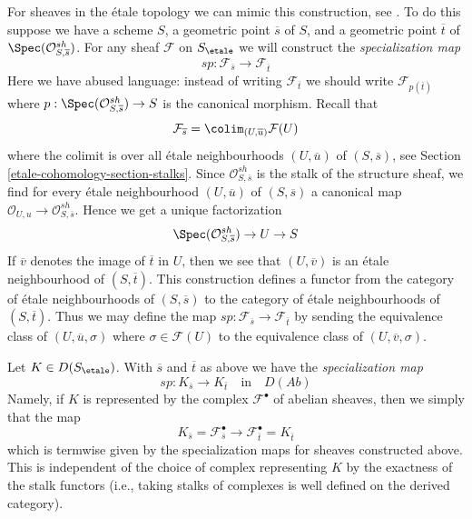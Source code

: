 \medskip\noindent
For sheaves in the \'etale topology we can mimic this construction, see
\cite[Exposee VIII, 7.7, page 397]{SGA4}. To do this suppose we have
a scheme $S$, a geometric point $\overline{s}$ of $S$, and a geometric
point $\overline{t}$ of $\Spec(\mathcal{O}^{sh}_{S, \overline{s}})$.
For any sheaf $\mathcal{F}$ on $S_\etale$ we will construct the
{\it specialization map}
$$
sp : \mathcal{F}_{\overline{s}} \longrightarrow \mathcal{F}_{\overline{t}}
$$
Here we have abused language: instead of writing
$\mathcal{F}_{\overline{t}}$ we should write $\mathcal{F}_{p(\overline{t})}$
where $p : \Spec(\mathcal{O}^{sh}_{S, \overline{s}}) \to S$ is the canonical
morphism. Recall that
$$
\mathcal{F}_{\overline{s}} = \colim_{(U, \overline{u})} \mathcal{F}(U)
$$
where the colimit is over all \'etale neighbourhoods $(U, \overline{u})$
of $(S, \overline{s})$, see Section \ref{etale-cohomology-section-stalks}. Since
$\mathcal{O}^{sh}_{S, \overline{s}}$ is the stalk of the
structure sheaf, we find for every \'etale neighbourhood
$(U, \overline{u})$ of $(S, \overline{s})$ a canonical map
$\mathcal{O}_{U, u} \to \mathcal{O}^{sh}_{S, \overline{s}}$.
Hence we get a unique factorization
$$
\Spec(\mathcal{O}^{sh}_{S, \overline{s}}) \to U \to S
$$
If $\overline{v}$ denotes the image of $\overline{t}$ in $U$, then we see that
$(U, \overline{v})$ is an \'etale neighbourhood of $(S, \overline{t})$.
This construction defines a functor from the category of \'etale neighbourhoods
of $(S, \overline{s})$ to the category of \'etale neighbourhoods of
$(S, \overline{t})$. Thus we may define the map
$sp : \mathcal{F}_{\overline{s}} \to \mathcal{F}_{\overline{t}}$
by sending the equivalence class of
$(U, \overline{u}, \sigma)$ where $\sigma \in \mathcal{F}(U)$
to the equivalence class of $(U, \overline{v}, \sigma)$.

\medskip\noindent
Let $K \in D(S_\etale)$. With $\overline{s}$ and $\overline{t}$
as above we have the {\it specialization map}
$$
sp : K_{\overline{s}} \longrightarrow K_{\overline{t}}
\quad\text{in}\quad D(\textit{Ab})
$$
Namely, if $K$ is represented by the complex $\mathcal{F}^\bullet$
of abelian sheaves, then we simply that the map
$$
K_{\overline{s}} = \mathcal{F}^\bullet_{\overline{s}}
\longrightarrow
\mathcal{F}^\bullet_{\overline{t}} = K_{\overline{t}}
$$
which is termwise given by the specialization maps for sheaves
constructed above. This is independent of the choice of complex
representing $K$ by the exactness of the stalk functors (i.e.,
taking stalks of complexes is well defined on the derived category).

